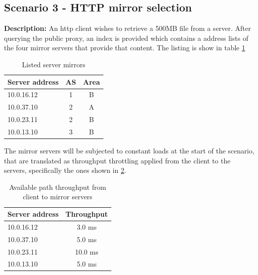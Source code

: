 \subsection{Scenario 3 - HTTP mirror selection}

\textbf{Description:} An \gls{http} client wishes to retrieve a 500MB file from a server.
After querying the public proxy, an index is provided which contains a address lists of the four mirror servers that provide that content.
The listing is show in table \ref{table:server-mirrors}

\begin{table}[H]
\centering
\begin{tabular}{|l|c|c|}
    \hline
    \textbf{Server address} & \textbf{AS} & \textbf{Area} \\ \hline
    10.0.16.12              & 1           & B             \\ \hline
    10.0.37.10              & 2           & A             \\ \hline
    10.0.23.11              & 2           & B             \\ \hline
    10.0.13.10              & 3           & B             \\ \hline
\end{tabular}
\caption{Listed server mirrors}
\label{table:server-mirrors}
\end{table}

The mirror servers will be subjected to constant loads at the start of the scenario, that are translated as throughput throttling applied from the client to the servers, specifically the ones shown in \ref{table:mirrors-bandwidth}.

\begin{table}[H]
\centering
\begin{tabular}{|l|c|}
    \hline
    \textbf{Server address} & \textbf{Throughput} \\ \hline
    10.0.16.12              & 3.0  ms             \\ \hline
    10.0.37.10              & 5.0  ms             \\ \hline
    10.0.23.11              & 10.0 ms             \\ \hline
    10.0.13.10              & 5.0  ms             \\ \hline
\end{tabular}
\caption{Available path throughput from client to mirror servers}
\label{table:mirrors-bandwidth}
\end{table}

